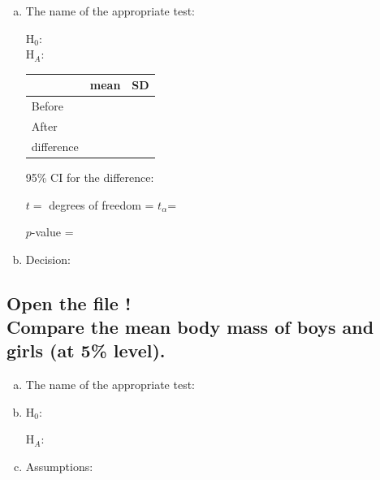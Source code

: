 		
\begin{enumerate}[a)]

\item The name of the appropriate test:	 \hrulefill

	H$_0$:	 \hrulefill\\
		 H$_A$:	 \hrulefill


\begin{multicols}{2}
		\begin{center}\small
		\begin{tabular}{lC{2cm}C{2cm}}
			\toprule	
				\textit{}		& mean & SD\\
			\midrule
			Before &&\\
			After  &&\\
			difference &&\\
			\bottomrule
		\end{tabular}\medskip
	\end{center}

	 95\% CI for the difference:  \hrulefill

	 $t =$ 	 \hrulefill\quad degrees of freedom = 	 \hrulefill\quad $t_\alpha$=	\hrulefill	
	 
	 $p$-value = \hrulefill 
	

\end{multicols}
	
	\item	Decision: \hrulefill

\end{enumerate}


	
\subsection{Open the file \quest!\\ Compare the mean body mass of boys and girls (at 5\% level).}
	

	\begin{enumerate}[a)]

	\item The name of the appropriate test:\hrulefill
	\item H$_0$:	\hrulefill
	
		H$_A$:	\hrulefill
		
	\item Assumptions: 	\hrulefill
	\end{enumerate}
	
